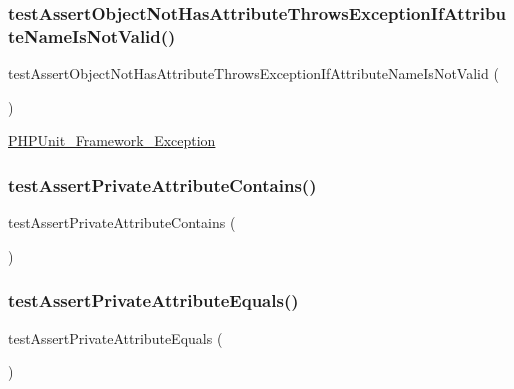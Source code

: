 \subsubsection{\texorpdfstring{test\+Assert\+Object\+Not\+Has\+Attribute\+Throws\+Exception\+If\+Attribute\+Name\+Is\+Not\+Valid()}{testAssertObjectNotHasAttributeThrowsExceptionIfAttributeNameIsNotValid()}}
{\footnotesize\ttfamily test\+Assert\+Object\+Not\+Has\+Attribute\+Throws\+Exception\+If\+Attribute\+Name\+Is\+Not\+Valid (\begin{DoxyParamCaption}{ }\end{DoxyParamCaption})}

\mbox{\hyperlink{class_p_h_p_unit___framework___exception}{P\+H\+P\+Unit\+\_\+\+Framework\+\_\+\+Exception}} \mbox{\label{class_framework___assert_test_abbbd76ff74a97d731af124c0394acfdb}} 
\subsubsection{\texorpdfstring{test\+Assert\+Private\+Attribute\+Contains()}{testAssertPrivateAttributeContains()}}
{\footnotesize\ttfamily test\+Assert\+Private\+Attribute\+Contains (\begin{DoxyParamCaption}{ }\end{DoxyParamCaption})}

\mbox{\label{class_framework___assert_test_ab0ee04a99513b5e1a9258e2d02b72573}} 
\subsubsection{\texorpdfstring{test\+Assert\+Private\+Attribute\+Equals()}{testAssertPrivateAttributeEquals()}}
{\footnotesize\ttfamily test\+Assert\+Private\+Attribute\+Equals (\begin{DoxyParamCaption}{ }\end{DoxyParamCaption})}

